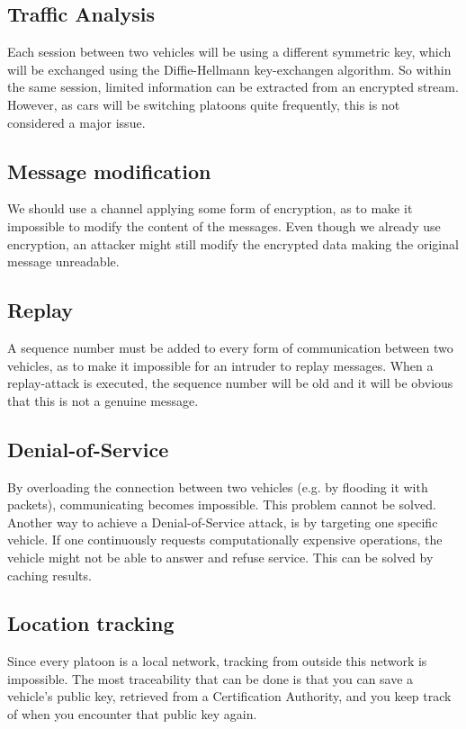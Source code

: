 \documentclass[a4paper, 11pt]{article}
\begin{document}
\subsection{Traffic Analysis}
Each session between two vehicles will be using a different symmetric key, which
will be exchanged using the Diffie-Hellmann key-exchangen algorithm. So within
the same session, limited information can be extracted from an encrypted stream.
However, as cars will be switching platoons quite frequently, this is not
considered a major issue.

\subsection{Message modification}
We should use a channel applying some form of encryption, as to make it
impossible to modify the content of the messages. Even though we already use
encryption, an attacker might still modify the encrypted data making the
original message unreadable.

\subsection{Replay}
A sequence number must be added to every form of communication between two
vehicles, as to make it impossible for an intruder to replay messages. When a
replay-attack is executed, the sequence number will be old and it will be
obvious that this is not a genuine message.

\subsection{Denial-of-Service} %
By overloading the connection between two vehicles (e.g. by flooding it
with packets), communicating becomes impossible. This problem cannot be
solved. \\

Another way to achieve a Denial-of-Service attack, is by targeting one specific
vehicle. If one continuously requests computationally expensive operations, the
vehicle might not be able to answer and refuse service. This can be solved by
caching results. %

\subsection{Location tracking} Since every platoon is a local network,
tracking from outside this network is impossible. The most traceability that
can be done is that you can save a vehicle's public key, retrieved from a
Certification Authority, and you keep track of when you encounter that public
key again.
\end{document}
